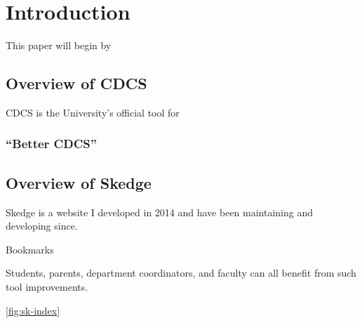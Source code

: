 
\chapter{Introduction}

This paper will begin by 

\section{Overview of CDCS}

CDCS is the University's official tool for 

\label{fig:cdcs-index}

\subsection{``Better CDCS''}


\section{Overview of Skedge}

Skedge is a website I developed in 2014 and have been maintaining and developing since.

Bookmarks

Students, parents, department coordinators, and faculty can all benefit from such tool improvements.

\ref{fig:sk-index}


